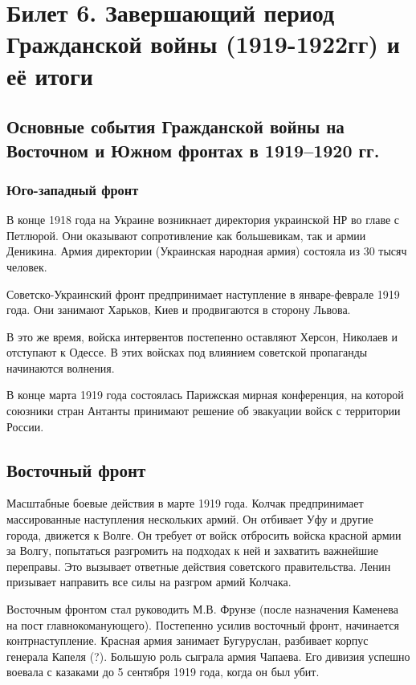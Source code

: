 \section{Билет 6. Завершающий период Гражданской войны (1919-1922гг) и её итоги}

\subsection{Основные события Гражданской войны на Восточном и Южном фронтах в 1919--1920 гг.}

\subsubsection{Юго-западный фронт}

В конце 1918 года на Украине возникнает директория украинской НР во главе с Петлюрой. Они оказывают сопротивление как большевикам, так и армии Деникина.
Армия директории (Украинская народная армия) состояла из 30 тысяч человек.

Советско-Украинский фронт предпринимает наступление в январе-феврале 1919 года. Они занимают Харьков, Киев и продвигаются в сторону Львова.

В это же время, войска интервентов постепенно оставляют Херсон, Николаев и отступают к Одессе. В этих войсках под влиянием советской пропаганды начинаются волнения.

В конце марта 1919 года состоялась Парижская мирная конференция, на которой союзники стран Антанты принимают решение об эвакуации войск с территории России.

\subsection{Восточный фронт}
Масштабные боевые действия в марте 1919 года. Колчак предпринимает массированные наступления нескольких армий. Он отбивает Уфу и другие города, движется к Волге. Он требует от войск отбросить войска красной армии за Волгу, попытаться разгромить на подходах к ней и захватить важнейшие переправы. Это вызывает ответные действия советского правительства. Ленин призывает направить все силы на разгром армий Колчака. 

Восточным фронтом стал руководить М.В. Фрунзе (после назначения Каменева на пост главнокоманующего). Постепенно усилив восточный фронт, начинается контрнаступление. Красная армия занимает Бугуруслан, разбивает корпус генерала Капеля (?). Большую роль сыграла армия Чапаева. Его дивизия успешно воевала с казаками до 5 сентября 1919 года, когда он был убит.

